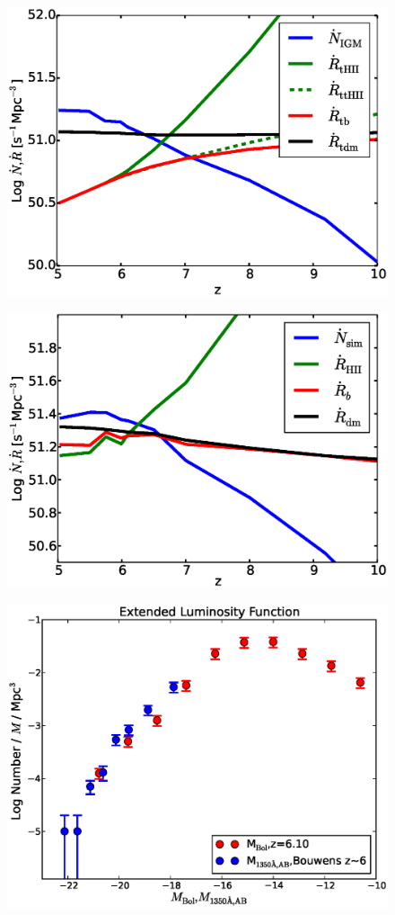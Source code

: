 \documentclass[letterpaper,10pt]{article}
\renewcommand{\(}{\left(}
\renewcommand{\)}{\right)}
\begin{document}
\begin{figure}
	\includegraphics[scale=0.45]{thresholded.eps}
\end{figure}
\begin{figure}
	\includegraphics[scale=0.45]{unthresholded.eps}
\end{figure}
\begin{figure}
	\includegraphics[scale=0.45]{extendedLF.eps}
\end{figure}
\end{document}
